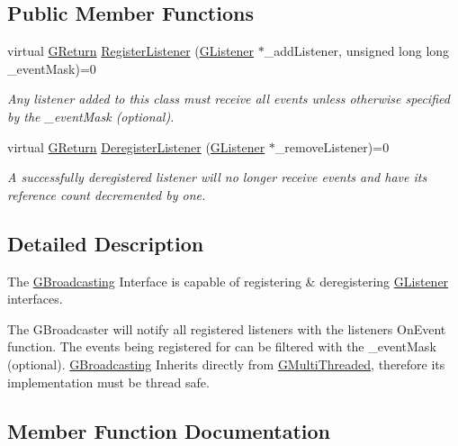 \subsection*{Public Member Functions}
\begin{DoxyCompactItemize}
\item 
virtual \hyperlink{namespaceGW_a67a839e3df7ea8a5c5686613a7a3de21}{G\+Return} \hyperlink{classGW_1_1CORE_1_1GBroadcasting_a293251421ba1169016f722df2f5b573b}{Register\+Listener} (\hyperlink{classGW_1_1CORE_1_1GListener}{G\+Listener} $\ast$\+\_\+add\+Listener, unsigned long long \+\_\+event\+Mask)=0
\begin{DoxyCompactList}\small\item\em Any listener added to this class must receive all events unless otherwise specified by the \+\_\+event\+Mask (optional). \end{DoxyCompactList}\item 
virtual \hyperlink{namespaceGW_a67a839e3df7ea8a5c5686613a7a3de21}{G\+Return} \hyperlink{classGW_1_1CORE_1_1GBroadcasting_afd6b1f41b646c668b1fcce2580681dd5}{Deregister\+Listener} (\hyperlink{classGW_1_1CORE_1_1GListener}{G\+Listener} $\ast$\+\_\+remove\+Listener)=0
\begin{DoxyCompactList}\small\item\em A successfully deregistered listener will no longer receive events and have its reference count decremented by one. \end{DoxyCompactList}\end{DoxyCompactItemize}


\subsection{Detailed Description}
The \hyperlink{classGW_1_1CORE_1_1GBroadcasting}{G\+Broadcasting} Interface is capable of registering \& deregistering \hyperlink{classGW_1_1CORE_1_1GListener}{G\+Listener} interfaces. 

The G\+Broadcaster will notify all registered listeners with the listeners On\+Event function. The events being registered for can be filtered with the \+\_\+event\+Mask (optional). \hyperlink{classGW_1_1CORE_1_1GBroadcasting}{G\+Broadcasting} Inherits directly from \hyperlink{classGW_1_1CORE_1_1GMultiThreaded}{G\+Multi\+Threaded}, therefore its implementation must be thread safe. 

\subsection{Member Function Documentation}
